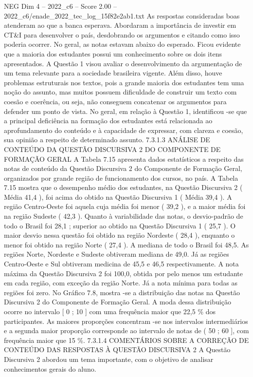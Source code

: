\begin{textsample}{NEG Dim 4 – 2022\_c6 – Score 2.00 – 2022\_c6/enade\_2022\_tec\_log\_15f82e2ab1.txt}
As respostas consideradas boas atenderam ao que a banca esperava.
Abordaram a importância de investir em CT\&I para desenvolver o país, desdobrando os argumentos e citando como isso poderia ocorrer.
No geral, as notas estavam abaixo do esperado.
Ficou evidente que a maioria dos estudantes possui um conhecimento sobre os dois itens apresentados.
A Questão 1 visou avaliar o desenvolvimento da argumentação de um tema relevante para a sociedade brasileira vigente.
Além disso, houve problemas estruturais nos textos, pois a grande maioria dos estudantes tem uma noção do assunto, mas muitos possuem dificuldade de construir um texto com coesão e coerência, ou seja, não conseguem concatenar os argumentos para defender um ponto de vista.
No geral, em relação à Questão 1, identificou -se que a principal deficiência na formação dos estudantes está relacionada ao aprofundamento do conteúdo e à capacidade de expressar, com clareza e coesão, sua opinião a respeito de determinado assunto. 7.3.1.3 ANÁLISE DE CONTEÚDO DA QUESTÃO DISCURSIVA 2 DO COMPONENTE DE FORMAÇÃO GERAL A Tabela 7.15 apresenta dados estatísticos a respeito das notas de conteúdo da Questão Discursiva 2 do Componente de Formação Geral, organizados por grande região de funcionamento dos cursos, no país.
A Tabela 7.15 mostra que o desempenho médio dos estudantes, na Questão Discursiva 2 ( Média 41,4 ), foi acima do obtido na Questão Discursiva 1 ( Média 39,4 ).
A região Centro-Oeste foi aquela cuja média foi menor ( 39,2 ), e a maior média foi na região Sudeste ( 42,3 ).
Quanto à variabilidade das notas, o desvio-padrão de todo o Brasil foi 28,1 ; superior ao obtido na Questão Discursiva 1 ( 25,7 ).
O maior desvio nessa questão foi obtido na região Nordeste ( 28,4 ), enquanto o menor foi obtido na região Norte ( 27,4 ).
A mediana de todo o Brasil foi 48,5.
As regiões Norte, Nordeste e Sudeste obtiveram mediana de 49,0.
Já as regiões Centro-Oeste e Sul obtiveram medicina de 45,5 e 46,5 respectivamente.
A nota máxima da Questão Discursiva 2 foi 100,0, obtida por pelo menos um estudante em cada região, com exceção da região Norte.
Já a nota mínima para todas as regiões foi zero.
No Gráfico 7.8, mostra -se a distribuição das notas na Questão Discursiva 2 do Componente de Formação Geral.
A moda dessa distribuição ocorre no intervalo [ 0 ; 10 ] com uma frequência maior que 22,5 \% dos participantes.
As maiores proporções concentram -se nos intervalos intermediários e a segunda maior proporção corresponde ao intervalo de notas de ( 50 ; 60 ], com frequência maior que 15 \%. 7.3.1.4 COMENTÁRIOS SOBRE A CORREÇÃO DE CONTEÚDO DAS RESPOSTAS À QUESTÃO DISCURSIVA 2 A Questão Discursiva 2 abordou um tema importante, com o objetivo de analisar conhecimentos gerais do aluno.

\end{textsample}
